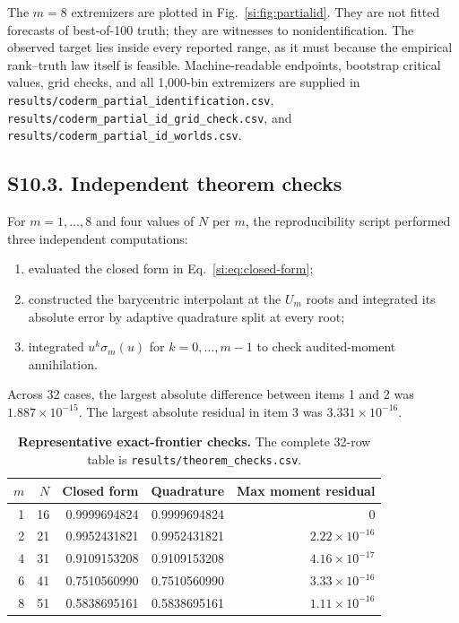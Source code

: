 \documentclass[10pt,twocolumn]{article}
\begin{document}
The $m=8$ extremizers are plotted in Fig.~\ref{si:fig:partialid}. They are not fitted forecasts of best-of-100 truth; they are witnesses to nonidentification. The observed target lies inside every reported range, as it must because the empirical rank--truth law itself is feasible. Machine-readable endpoints, bootstrap critical values, grid checks, and all 1,000-bin extremizers are supplied in \texttt{results/coderm\_partial\_identification.csv}, \texttt{results/coderm\_partial\_id\_grid\_check.csv}, and \texttt{results/coderm\_partial\_id\_worlds.csv}.

\subsection*{S10.3. Independent theorem checks}

For $m=1,\ldots,8$ and four values of $N$ per $m$, the reproducibility script performed three independent computations:
\begin{enumerate}
\item evaluated the closed form in Eq.~\ref{si:eq:closed-form};
\item constructed the barycentric interpolant at the $U_m$ roots and integrated its absolute error by adaptive quadrature split at every root;
\item integrated $u^k\sigma_m(u)$ for $k=0,\ldots,m-1$ to check audited-moment annihilation.
\end{enumerate}
Across 32 cases, the largest absolute difference between items 1 and 2 was $1.887\times10^{-15}$. The largest absolute residual in item 3 was $3.331\times10^{-16}$.

\begin{table}[h]
\centering
\caption{\textbf{Representative exact-frontier checks.} The complete 32-row table is \texttt{results/theorem\_checks.csv}.}
\label{si:tab:checks}
\begin{tabular}{rrrrr}
\toprule
$m$ & $N$ & Closed form & Quadrature & Max moment residual \\
\midrule
1 & 16 & 0.9999694824 & 0.9999694824 & 0 \\
2 & 21 & 0.9952431821 & 0.9952431821 & $2.22\times10^{-16}$ \\
4 & 31 & 0.9109153208 & 0.9109153208 & $4.16\times10^{-17}$ \\
6 & 41 & 0.7510560990 & 0.7510560990 & $3.33\times10^{-16}$ \\
8 & 51 & 0.5838695161 & 0.5838695161 & $1.11\times10^{-16}$ \\
\bottomrule
\end{tabular}
\end{table}
\end{document}
